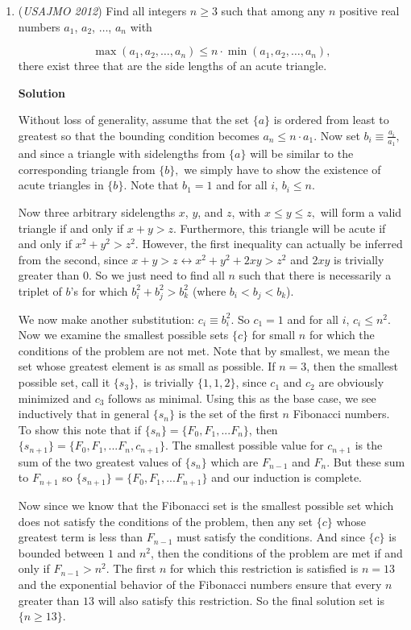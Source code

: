 \begin{enumerate}
 


	\item (\textit{USAJMO 2012}) Find all integers $n \ge 3$ such that among any $n$ positive real numbers $a_1$, $a_2$, $\dots$, $a_n$ with

 \[\max(a_1, a_2, \dots, a_n) \le n \cdot \min(a_1, a_2, \dots, a_n),\]
there exist three that are the side lengths of an acute triangle.


 



\textbf{Solution}

Without loss of generality, assume that the set $\{a\}$ is ordered from least to greatest so that the bounding condition becomes $a_n \le n \cdot a_1.$ Now set $b_i \equiv \frac{a_i}{a_1},$ and since a triangle with sidelengths from $\{a\}$ will be similar to the corresponding triangle from $\{b\},$ we simply have to show the existence of acute triangles in $\{b\}.$ Note that $b_1 = 1$ and for all $i$, $b_i \le n.$

 Now three arbitrary sidelengths $x$, $y$, and $z$, with $x \le y \le z,$ will form a valid triangle if and only if $x+y>z.$ Furthermore, this triangle will be acute if and only if $x^2 + y^2 > z^2.$ However, the first inequality can actually be inferred from the second, since $x+y>z \longleftrightarrow x^2 + y^2 +2xy > z^2$ and $2xy$ is trivially greater than $0.$ So we just need to find all $n$ such that there is necessarily a triplet of $b$'s for which $b_i^2 + b_j^2 > b_k^2$ (where $b_i < b_j < b_k$).

 We now make another substitution: $c_i \equiv b_i ^2.$ So $c_1 = 1$ and for all $i$, $c_i \le n^2.$ Now we examine the smallest possible sets $\{c\}$ for small $n$ for which the conditions of the problem are not met. Note that by smallest, we mean the set whose greatest element is as small as possible. If $n=3$, then the smallest possible set, call it $\{s_3\},$ is trivially $\{1,1,2\}$, since $c_1$ and $c_2$ are obviously minimized and $c_3$ follows as minimal. Using this as the base case, we see inductively that in general $\{s_n\}$ is the set of the first $n$ Fibonacci numbers. To show this note that if $\{s_n\} = \{F_0, F_1, ... F_n\}$, then $\{s_{n+1}\} = \{F_0, F_1, ... F_n, c_{n+1}\}.$ The smallest possible value for $c_{n+1}$ is the sum of the two greatest values of $\{s_n\}$ which are $F_{n-1}$ and $F_n$. But these sum to $F_{n+1}$ so $\{s_{n+1}\} = \{F_0, F_1, ... F_{n+1}\}$ and our induction is complete.

 Now since we know that the Fibonacci set is the smallest possible set which does not satisfy the conditions of the problem, then any set $\{c\}$ whose greatest term is less than $F_{n-1}$ must satisfy the conditions. And since $\{c\}$ is bounded between $1$ and $n^2$, then the conditions of the problem are met if and only if $F_{n-1} > n^2$. The first $n$ for which this restriction is satisfied is $n=13$ and the exponential behavior of the Fibonacci numbers ensure that every $n$ greater than $13$ will also satisfy this restriction. So the final solution set is $\boxed{\{n \ge 13\}}$.


\end{enumerate}
